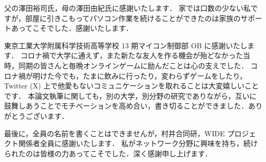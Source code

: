 父の澤田裕司氏，母の澤田由紀氏に感謝いたします．
家では口数の少ない私ですが，部屋に引きこもってパソコン作業を続けることができたのは家族のサポートあってこそでした．感謝いたします．

東京工業大学附属科学技術高等学校 13 期マイコン制御部 OB に感謝いたします．
コロナ禍で大学に通えず，また新たな友人を作る機会が殆どなかった当時，同期の皆さんと毎晩オンラインゲームに励んだことは心の支えでした．
コロナ禍が明けた今でも，たまに飲みに行ったり，変わらずゲームをしたり，Twitter (X) 上で他愛もないコミュニケーションを取れることは大変嬉しいことです．
本論文執筆に関しても，別の大学，別分野の研究でありながら，互いに鼓舞しあうことでモチベーションを高め合い，書き切ることができました．ありがとうございます．

最後に，全員の名前を書くことはできませんが，村井合同研，WIDE プロジェクト関係者全員に感謝いたします．
私がネットワーク分野に興味を持ち，続けられたのは皆様の力あってこそでした．深く感謝申し上げます．